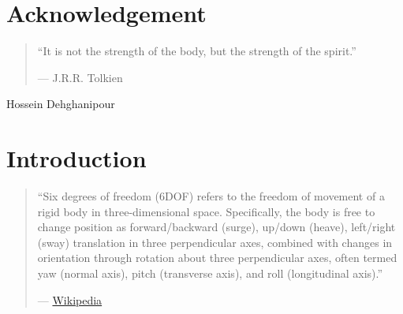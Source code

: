 \documentclass[12pt , a4paper]{report}
\begin{document}
%
%
\thispagestyle{empty}
\setmainfont{Times New Roman}


\newpage
%
%
\chapter*{Acknowledgement}
\begin{quote}
        ``It is not the strength of the body, but the strength of the spirit.''
\begin{flushright}
    — J.R.R. Tolkien
\end{flushright}
\end{quote}

\begin{flushright}
Hossein Dehghanipour
\end{flushright}
\newpage
%
%
\tableofcontents
\newpage

%
%
\thispagestyle{empty}
\chapter*{Introduction}
\begin{quote}
        ``Six degrees of freedom (6DOF) refers to the freedom of movement of a rigid body in three-dimensional space. Specifically, the body is free to change position as forward/backward (surge), up/down (heave), left/right (sway) translation in three perpendicular axes, combined with changes in orientation through rotation about three perpendicular axes, often termed yaw (normal axis), pitch (transverse axis), and roll (longitudinal axis).''
\begin{flushright}
    — \href{https://en.wikipedia.org/wiki/Six_degrees_of_freedom}{Wikipedia}
\end{flushright}
\end{quote}


%
%
\end{document}
